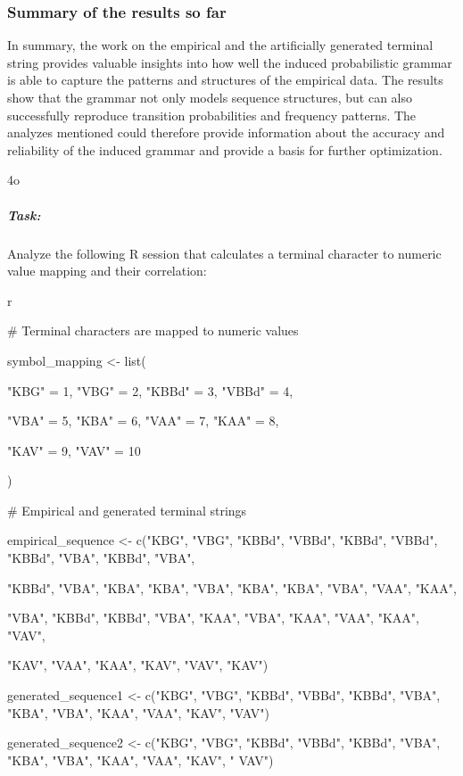 \documentclass[
]{article}
\begin{document}
\subsubsection{\texorpdfstring{\textbf{Summary of the results so
far}}{Summary of the results so far}}\label{summary-of-the-results-so-far}

In summary, the work on the empirical and the artificially generated
terminal string provides valuable insights into how well the induced
probabilistic grammar is able to capture the patterns and structures of
the empirical data. The results show that the grammar not only models
sequence structures, but can also successfully reproduce transition
probabilities and frequency patterns. The analyzes mentioned could
therefore provide information about the accuracy and reliability of the
induced grammar and provide a basis for further optimization.

4o

\subparagraph{\texorpdfstring{ \textbf{Task:}}{ Task:}}\label{task-2}

Analyze the following R session that calculates a terminal character to
numeric value mapping and their correlation:

r

\# Terminal characters are mapped to numeric values

symbol\_mapping \textless- list(

"KBG" = 1, "VBG" = 2, "KBBd" = 3, "VBBd" = 4,

"VBA" = 5, "KBA" = 6, "VAA" = 7, "KAA" = 8,

"KAV" = 9, "VAV" = 10

)

\# Empirical and generated terminal strings

empirical\_sequence \textless- c("KBG", "VBG", "KBBd", "VBBd", "KBBd",
"VBBd", "KBBd", "VBA", "KBBd", "VBA",

"KBBd", "VBA", "KBA", "KBA", "VBA", "KBA", "KBA", "VBA", "VAA", "KAA",

"VBA", "KBBd", "KBBd", "VBA", "KAA", "VBA", "KAA", "VAA", "KAA", "VAV",

"KAV", "VAA", "KAA", "KAV", "VAV", "KAV")

generated\_sequence1 \textless- c("KBG", "VBG", "KBBd", "VBBd", "KBBd",
"VBA", "KBA", "VBA", "KAA", "VAA", "KAV", "VAV")

generated\_sequence2 \textless- c("KBG", "VBG", "KBBd", "VBBd", "KBBd",
"VBA", "KBA", "VBA", "KAA", "VAA", "KAV", " VAV")
\end{document}
